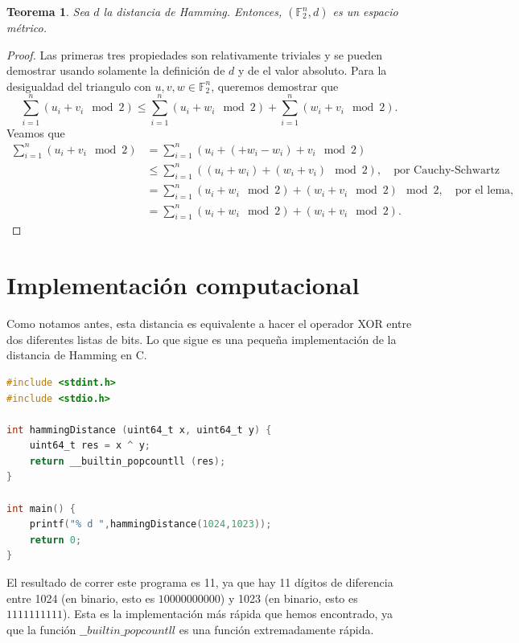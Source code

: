 \documentclass[spanish,twoside]{book}
\newtheorem{theorem}{Teorema}
\begin{document}
\begin{theorem}
	Sea $d$ la distancia de Hamming. Entonces, $(\mathbb{F}^n_2,d)$ es un espacio métrico. 
\end{theorem}
\begin{proof}
	Las primeras tres propiedades son relativamente triviales y se pueden demostrar usando solamente la definición de $d$ y de el valor absoluto. Para la desigualdad del triangulo con $u,v,w \in \mathbb{F}^n_2$, queremos demostrar que 
	\[ \sum_{i=1}^n \left( u_i + v_i \mod 2\right)  \leq \sum_{i=1}^n \left( u_i + w_i \mod 2\right)  + \sum_{i=1}^n \left( w_i + v_i \mod 2 \right). \]
	Veamos que 
	\begin{align*}
		\sum_{i=1}^n \left( u_i + v_i \mod 2\right) &= \sum_{i=1}^n \left( u_i + (+w_i - w_i) + v_i \mod 2\right) \\
		&\leq \sum_{i=1}^n \left( (u_i  + w_i) + (w_i + v_i) \mod 2\right), \quad \text{por Cauchy-Schwartz} \\
		&= \sum_{i=1}^n \left( u_i  + w_i \mod 2 \right)  + \left( w_i + v_i \mod 2\right) \mod 2, \quad \text{por el lema,} \\
		&= \sum_{i=1}^n \left( u_i  + w_i \mod 2 \right)  + \left( w_i + v_i \mod 2\right).
	\end{align*}
\end{proof}
	
\section*{Implementación computacional}

Como notamos antes, esta distancia es equivalente a hacer el operador XOR entre dos diferentes listas de bits. Lo que sigue es una pequeña implementación de la distancia de Hamming en C. 

\begin{lstlisting}[language=C]
#include <stdint.h>
#include <stdio.h>

int hammingDistance (uint64_t x, uint64_t y) {
	uint64_t res = x ^ y;
	return __builtin_popcountll (res);
}

int main() {
	printf("% d ",hammingDistance(1024,1023));
	return 0;
}
\end{lstlisting}

El resultado de correr este programa es 11, ya que hay 11 dígitos de diferencia entre 1024 (en binario, esto es $10000000000$) y 1023 (en binario, esto es $1111111111$). Esta es la implementación más rápida que hemos encontrado, ya que la función $\_\_builtin\_popcountll$ es una función extremadamente rápida. 


	


	
	
	
	
\end{document}
